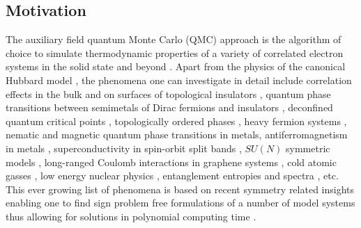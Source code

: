 
\subsection{Motivation}

The auxiliary field quantum Monte Carlo (QMC) approach is the algorithm of choice to simulate  thermodynamic properties of a variety of correlated electron systems in the solid state and beyond \cite{Blankenbecler81,White89,Sugiyama86,Sorella89, Duane87, Assaad08_rev}.  
Apart from the physics of the  canonical Hubbard model 
\cite{Scalapino07},   the phenomena  one can investigate in detail include correlation effects in the bulk and on surfaces of topological insulators \cite{Hohenadler10,Zheng11}, quantum phase transitions between semimetals of Dirac fermions  and insulators \cite{Assaad13,Toldin14,Otsuka16},  
deconfined quantum critical points \cite{Li15a,Assaad16}, topologically ordered phases \cite{Assaad16}, heavy fermion systems \cite{Assaad99a,Capponi00}, nematic \cite{Schattner15} and magnetic  \cite{Xu16b} quantum phase transitions in metals, antiferromagnetism in metals \cite{Berg12},    superconductivity in spin-orbit split bands \cite{Tang14_1}, $SU(N)$ symmetric models \cite{Assaad04,Lang13},  long-ranged Coulomb interactions in graphene systems \cite{Hohenadler14,Tang15},  cold atomic gasses  \cite{Rigol03},  low energy nuclear physics \cite{Lee09},  entanglement entropies and spectra \cite{Grover13,Broecker14,Assaad13a,Assaad15},  etc. 
This ever growing list of phenomena is based on  recent symmetry related insights enabling one to  find  sign problem  free formulations of a number of model systems thus allowing for solutions in polynomial computing time \cite{Wu04,Huffman14,Yao14a,Wei16}.  

